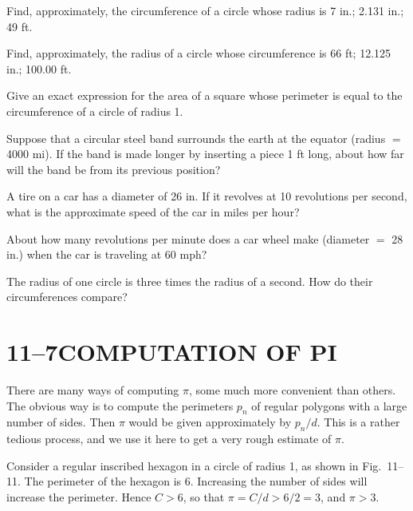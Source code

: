\documentclass[11pt]{book}
\theoremstyle{XIplainnote}
\theoremstyle{bkplain}
\begin{document}
\begin{exercisecols}
\begin{exlist}
\item Find, approximately, the circumference of a circle whose radius is 7 in.;
      2.131 in.; 49 ft.
\item Find, approximately, the radius of a circle whose circumference is 66 ft;
      12.125 in.; 100.00 ft.
\item Give an exact expression for the area of a square whose perimeter is
      equal to the circumference of a circle of radius 1.
\item Suppose that a circular steel band surrounds the earth at the equator
      (radius $=$ 4000 mi). If the band is made longer by inserting a piece
      1 ft long, about how far will the band be from its previous position?
\item A tire on a car has a diameter of 26 in. If it revolves at 10 revolutions
      per second, what is the approximate speed of the car in miles per hour?
\item About how many revolutions per minute does a car wheel make (diameter
      $=$ 28 in.) when the car is traveling at 60 mph?
\item The radius of one circle is three times the radius of a second. How do
      their circumferences compare?
\end{exlist}
\end{exercisecols}

\section*{11--7\quad COMPUTATION OF PI}

There are many ways of computing $\pi$, some much more convenient than others.
The obvious way is to compute the perimeters $p_n$ of regular polygons with a
large number of sides. Then $\pi$ would be given approximately by $p_n/d$. This
is a rather tedious process, and we use it here to get a very rough estimate of
$\pi$.

\FIGXIELEVEN

Consider a regular inscribed hexagon in a circle of radius 1, as shown in
Fig.~11--11. The perimeter of the hexagon is 6. Increasing the number of sides
will increase the perimeter. Hence $C > 6$, so that $\pi = C/d > 6/2 = 3$, and
$\pi > 3$.
\end{document}
